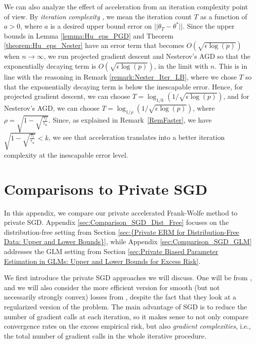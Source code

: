 \documentclass{article}
\begin{document}
We can also analyze the effect of acceleration from an iteration complexity point of view. By \emph{iteration complexity} \cite{Wang_Iter_Comp, Richtarik_Iter_Comp}, we mean the iteration count $T$ as a function of $a > 0$, where $a$ is a desired upper bound error on $||\theta_T - \theta^*||$. Since the upper bounds in Lemma \ref{lemma:Hu_eps_PGD} and Theorem \ref{theorem:Hu_eps_Nester} have an error term that becomes $O\left(\sqrt{\epsilon \log(p)}\right)$ when $n \rightarrow \infty$, we run projected gradient descent and Nesterov's AGD so that the exponentially decaying term is $O\left(\sqrt{\epsilon \log(p)}\right)$, in the limit with $n$. This is in line with the reasoning in Remark \ref{remark:Nester_Iter_LB}, where we chose $T$ so that the exponentially decaying term is below the inescapable error. Hence, for projected gradient descent, we can choose $T = \log_{1/k}\left(1/\sqrt{\epsilon \log(p)}\right)$, and for Nesterov's AGD, we can choose $T = \log_{1/\rho}\left(1/\sqrt{\epsilon \log(p)}\right)$, where $\rho = \sqrt{1 - \sqrt{\frac{\tau_l}{\tau_u}}}$. Since, as explained in Remark~\ref{RemFaster}, we have $\sqrt{1 - \sqrt{\frac{\tau_l}{\tau_u}}} < k$, we see that acceleration translates into a better iteration complexity at the inescapable error level.


\section{Comparisons to Private SGD}
\label{AppSGD}

In this appendix, we compare our private accelerated Frank-Wolfe method to private SGD. Appendix \ref{sec:Comparison_SGD_Dist_Free} focuses on the distribution-free setting from Section \ref{sec:{Private ERM for Distribution-Free Data: Upper and Lower Bounds}}, while Appendix \ref{sec:Comparison_SGD_GLM} addresses the GLM setting from Section \ref{sec:Private Biased Parameter Estimation in GLMs: Upper and Lower Bounds for Excess Risk}.

We first introduce the private SGD approaches we will discuss. One will be from \cite{Bassily_SGD_l2}, and we will also consider the more efficient version for smooth (but not necessarily strongly convex) losses from \cite{DP_ERM_Faster}, despite the fact that they look at a regularized version of the problem. The main advantage of SGD is to reduce the number of gradient calls at each iteration, so it makes sense to not only compare convergence rates on the excess empirical risk, but also \emph{gradient complexities}, i.e., the total number of gradient calls in the whole iterative procedure. 
\end{document}
